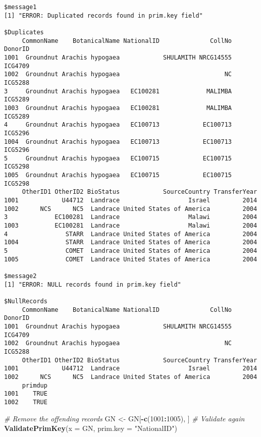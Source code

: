 \documentclass[]{article}
\newenvironment{Shaded}{\begin{snugshade}}{\end{snugshade}}
\newcommand{\CommentTok}[1]{\textcolor[rgb]{0.56,0.35,0.01}{\textit{#1}}}
\newcommand{\DataTypeTok}[1]{\textcolor[rgb]{0.13,0.29,0.53}{#1}}
\newcommand{\DecValTok}[1]{\textcolor[rgb]{0.00,0.00,0.81}{#1}}
\newcommand{\KeywordTok}[1]{\textcolor[rgb]{0.13,0.29,0.53}{\textbf{#1}}}
\newcommand{\NormalTok}[1]{#1}
\newcommand{\OperatorTok}[1]{\textcolor[rgb]{0.81,0.36,0.00}{\textbf{#1}}}
\newcommand{\StringTok}[1]{\textcolor[rgb]{0.31,0.60,0.02}{#1}}
\begin{document}
\begin{verbatim}
$message1
[1] "ERROR: Duplicated records found in prim.key field"

$Duplicates
     CommonName    BotanicalName NationalID              CollNo DonorID
1001  Groundnut Arachis hypogaea            SHULAMITH NRCG14555 ICG4709
1002  Groundnut Arachis hypogaea                             NC ICG5288
3     Groundnut Arachis hypogaea   EC100281             MALIMBA ICG5289
1003  Groundnut Arachis hypogaea   EC100281             MALIMBA ICG5289
4     Groundnut Arachis hypogaea   EC100713            EC100713 ICG5296
1004  Groundnut Arachis hypogaea   EC100713            EC100713 ICG5296
5     Groundnut Arachis hypogaea   EC100715            EC100715 ICG5298
1005  Groundnut Arachis hypogaea   EC100715            EC100715 ICG5298
     OtherID1 OtherID2 BioStatus            SourceCountry TransferYear
1001            U44712  Landrace                   Israel         2014
1002      NCS      NC5  Landrace United States of America         2004
3             EC100281  Landrace                   Malawi         2004
1003          EC100281  Landrace                   Malawi         2004
4                STARR  Landrace United States of America         2004
1004             STARR  Landrace United States of America         2004
5                COMET  Landrace United States of America         2004
1005             COMET  Landrace United States of America         2004

$message2
[1] "ERROR: NULL records found in prim.key field"

$NullRecords
     CommonName    BotanicalName NationalID              CollNo DonorID
1001  Groundnut Arachis hypogaea            SHULAMITH NRCG14555 ICG4709
1002  Groundnut Arachis hypogaea                             NC ICG5288
     OtherID1 OtherID2 BioStatus            SourceCountry TransferYear
1001            U44712  Landrace                   Israel         2014
1002      NCS      NC5  Landrace United States of America         2004
     primdup
1001    TRUE
1002    TRUE
\end{verbatim}

\begin{Shaded}
\begin{Highlighting}[]
\CommentTok{# Remove the offending records}
\NormalTok{GN <-}\StringTok{ }\NormalTok{GN[}\OperatorTok{-}\KeywordTok{c}\NormalTok{(}\DecValTok{1001}\OperatorTok{:}\DecValTok{1005}\NormalTok{), ]}
\CommentTok{# Validate again}
\KeywordTok{ValidatePrimKey}\NormalTok{(}\DataTypeTok{x =}\NormalTok{ GN, }\DataTypeTok{prim.key =} \StringTok{"NationalID"}\NormalTok{)}
\end{Highlighting}
\end{Shaded}
\end{document}
